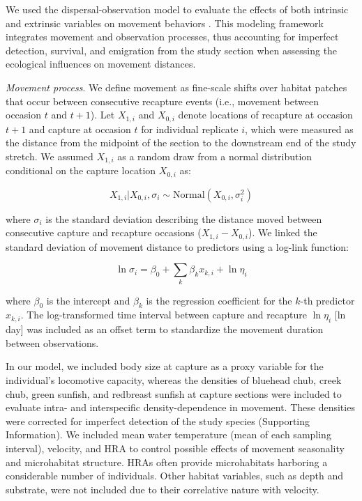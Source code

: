 \documentclass[11pt, class=article, crop=false]{standalone}
\begin{document}
We used the dispersal-observation model to evaluate the effects of both intrinsic and extrinsic variables on movement behaviors \citep{teruiModelingDispersalUsing2020}. This modeling framework integrates movement and observation processes, thus accounting for imperfect detection, survival, and emigration from the study section when assessing the ecological influences on movement distances.

\textit{Movement process}. We define movement as fine-scale shifts over habitat patches that occur between consecutive recapture events (i.e., movement between occasion $t$ and $t+1$). Let $X_{1,i}$ and $X_{0,i}$ denote locations of recapture at occasion $t+1$ and capture at occasion $t$ for individual replicate $i$, which were measured as the distance from the midpoint of the section to the downstream end of the study stretch. We assumed $X_{1,i}$ as a random draw from a normal distribution conditional on the capture location $X_{0,i}$ as:    

\begin{equation}
    X_{1, i}|X_{0, i}, \sigma_i \sim \text{Normal}(X_{0, i}, \sigma_i^2)
    \label{eq:normal}
\end{equation}

where $\sigma_i$ is the standard deviation describing the distance moved between consecutive capture and recapture occasions ($X_{1,i} - X_{0,i}$).
We linked the standard deviation of  movement distance to predictors using a log-link function: 

\begin{equation}
    \ln \sigma_i = \beta_0 + \sum_{k} \beta_k x_{k,i} + \ln \eta_i
    \label{eq:linear-pred}
\end{equation}

where $\beta_0$ is the intercept and $\beta_k$ is the regression coefficient for the $k$-th predictor $x_{k,i}$. The log-transformed time interval between capture and recapture $\ln \eta_i$ [ln day] was included as an offset term to standardize the movement duration between observations.

In our model, we included body size at capture as a proxy variable for the individual’s locomotive capacity, whereas the densities of bluehead chub, creek chub, green sunfish, and redbreast sunfish at capture sections were included to evaluate intra- and interspecific density-dependence in movement. These densities were corrected for imperfect detection of the study species (Supporting Information). We included mean water temperature (mean of each sampling interval), velocity, and HRA to control possible effects of movement seasonality and microhabitat structure. HRAs often provide microhabitats harboring a considerable number of individuals.  Other habitat variables, such as depth and substrate, were not included due to their correlative nature with velocity. 
\end{document}
